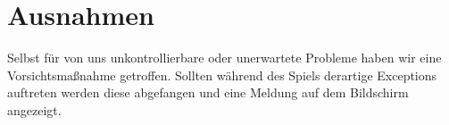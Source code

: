 %



\chapter{Ausnahmen}
\label{Kapitel:Ausnahmen}

Selbst für von uns unkontrollierbare oder unerwartete Probleme haben wir eine Vorsichtsmaßnahme getroffen. Sollten während des Spiels derartige Exceptions auftreten werden diese abgefangen und eine Meldung auf dem Bildschirm angezeigt.\\










